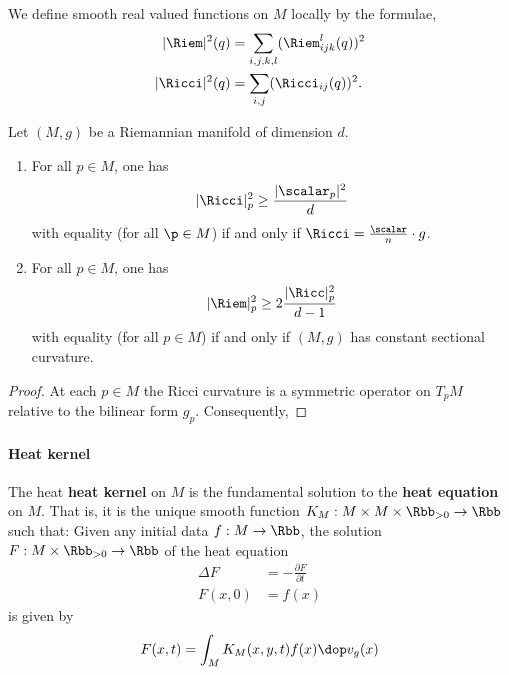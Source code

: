 We define smooth real valued functions on $M$ locally by the formulae,
\begin{align}
  |\Riem|^2(q)  & = \sum_{i,j,k,l} (\Riem_{ijk}^l(q))^2 \\
  |\Ricci|^2(q) & = \sum_{i,j} (\Ricci_{ij}(q))^2.
\end{align}

\begin{proposition}
  Let $(M,g)$ be a Riemannian manifold of dimension $d$.
  \begin{enumerate}
    \item For all $p \in M$, one has
          \begin{align}
            |\Ricci|^2_p \geq \frac{|\scalar_p|^2}{d}
          \end{align}
          with equality (for all $\p \in M$) if and only if $\Ricci = \frac{\scalar}{n}\cdot g$.
    \item For all $p \in M$, one has
          \begin{align}
            |\Riem|^2_p \geq 2 \frac{|\Ricc|_p^2}{d-1}
          \end{align}
          with equality (for all $p \in M$) if and only if $(M,g)$ has constant sectional curvature.
  \end{enumerate}
\end{proposition}
\begin{proof}
  At each $p \in M$ the Ricci curvature is a symmetric operator on $T_p M$ relative to the bilinear form $g_p$. Consequently, 
\end{proof}


\paragraph{Heat kernel}
The heat \textbf{heat kernel} on $M$ is the fundamental solution to the \textbf{heat equation} on $M$. That is,  it is the unique smooth function $K_M:M\times M \times \Rbb_{>0} \to \Rbb$ such that:  Given any initial data $f: M \to \Rbb$, the solution $F:M\times \Rbb_{>0} \to \Rbb$ of the heat equation
\begin{align}
  \Delta F & = - \frac{\partial F}{\partial t} \\
  F(x,0)   & = f(x)
\end{align}
is given by
\begin{align}
  F(x,t) = \int_M K_M(x,y,t)f(x) \dop v_{g}(x)
\end{align}


